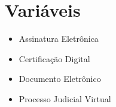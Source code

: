 \chapter{Variáveis}
\begin{itemize}
    \item Assinatura Eletrônica
    \item Certificação Digital
    \item Documento Eletrônico
    \item Processo Judicial Virtual
\end{itemize}
